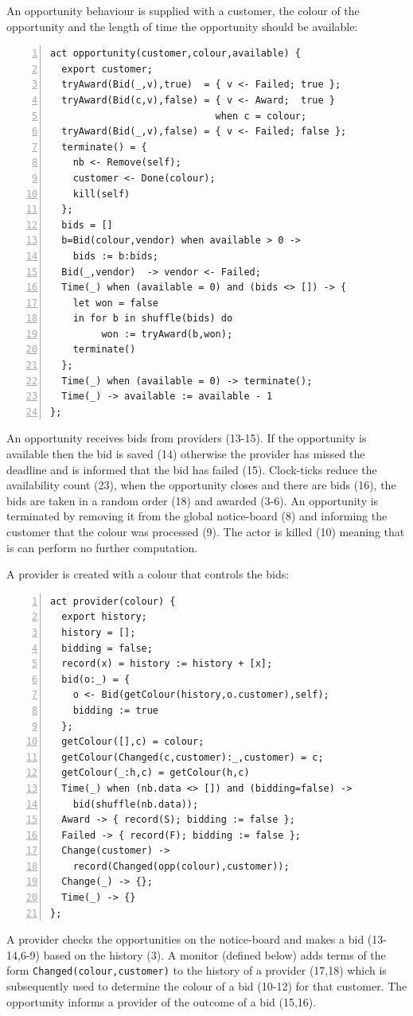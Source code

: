 \documentclass[10pt,numbers]{sigplanconf}
\def\code#1{{\normalfont\lstinline[basicstyle=\small\ttfamily]{#1}}}
\begin{document}
An opportunity behaviour is supplied with a customer, the colour of the opportunity and the length of time the opportunity should be available:
\begin{lstlisting}[numbers=left]
act opportunity(customer,colour,available) {
  export customer;
  tryAward(Bid(_,v),true)  = { v <- Failed; true };
  tryAward(Bid(c,v),false) = { v <- Award;  true } 
                             when c = colour;
  tryAward(Bid(_,v),false) = { v <- Failed; false };
  terminate() = {                           
    nb <- Remove(self);                                         
    customer <- Done(colour);
    kill(self)                      
  };
  bids = []                                                     
  b=Bid(colour,vendor) when available > 0 -> 
    bids := b:bids;                       
  Bid(_,vendor)  -> vendor <- Failed;
  Time(_) when (available = 0) and (bids <> []) -> { 
    let won = false 
    in for b in shuffle(bids) do 
         won := tryAward(b,won); 
    terminate()                               
  };
  Time(_) when (available = 0) -> terminate();
  Time(_) -> available := available - 1
};
\end{lstlisting}
An opportunity receives bids from providers (13-15). If the opportunity is available then the bid is saved (14) otherwise the provider has missed the deadline and is informed that the bid has failed (15). Clock-ticks reduce the availability count (23), when the opportunity closes and there are bids (16), the bids are taken in a random order (18) and awarded (3-6). An opportunity is terminated by removing it from the global notice-board (8) and informing the customer that the colour was processed (9). The actor is killed (10) meaning that is can perform no further computation.

A provider is created with a colour that controls the bids:
\begin{lstlisting}[numbers=left]
act provider(colour) {  
  export history;                                                 
  history = [];
  bidding = false;
  record(x) = history := history + [x];
  bid(o:_) = { 
    o <- Bid(getColour(history,o.customer),self); 
    bidding := true 
  };
  getColour([],c) = colour;
  getColour(Changed(c,customer):_,customer) = c;
  getColour(_:h,c) = getColour(h,c)
  Time(_) when (nb.data <> []) and (bidding=false) -> 
    bid(shuffle(nb.data));
  Award -> { record(S); bidding := false };
  Failed -> { record(F); bidding := false };
  Change(customer) -> 
    record(Changed(opp(colour),customer));
  Change(_) -> {};
  Time(_) -> {}
};
\end{lstlisting}
A provider checks the opportunities on the notice-board and makes a bid (13-14,6-9) based on the history (3). A monitor (defined below) adds terms of the form \code{Changed(colour,customer)} to the history of a provider (17,18) which is subsequently used to determine the colour of a bid (10-12) for that customer. The opportunity informs a provider of the outcome of a bid (15,16).
\end{document}
